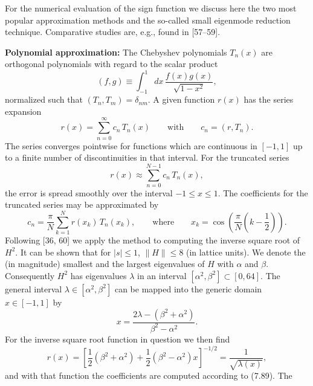 For the numerical evaluation of the sign function we discuss here the two most
popular approximation methods and the so-called small eigenmode reduction
technique. Comparative studies are, e.g., found in [57--59].

\textbf{Polynomial approximation:} The Chebyshev polynomials $T_n(x)$ are
orthogonal polynomials with regard to the scalar product
\begin{equation}
  (f, g) \equiv \int_{-1}^{1} dx\,\frac{f(x)g(x)}{\sqrt{1-x^2}},
\end{equation}
normalized such that $(T_n, T_m) = \delta_{nm}$. A given function $r(x)$ has
the series expansion
\begin{equation}
  r(x) = \sum_{n=0}^{\infty} c_n\,T_n(x) \qquad \text{with} \qquad
  c_n = (r, T_n) .
\end{equation}
The series converges pointwise for functions which are continuous in $[-1, 1]$
up to a finite number of discontinuities in that interval. For the truncated
series
\begin{equation}
  r(x) \approx \sum_{n=0}^{N-1} c_n\,T_n(x),
\end{equation}
the error is spread smoothly over the interval $-1 \leq x \leq 1$. The
coefficients for the truncated series may be approximated by
\begin{equation}
  c_n = \frac{\pi}{N}\sum_{k=1}^{N} r(x_k)\,T_n(x_k),
  \qquad \text{where} \qquad
  x_k = \cos\!\left(\frac{\pi}{N}\left(k-\frac{1}{2}\right)\right) .
\end{equation}
Following [36, 60] we apply the method to computing the inverse square root of
$H^2$. It can be shown that for $|s| \leq 1$, $\|H\| \leq 8$ (in lattice
units). We denote the (in magnitude) smallest and the largest eigenvalues of
$H$ with $\alpha$ and $\beta$. Consequently $H^2$ has eigenvalues $\lambda$ in
an interval $[\alpha^2, \beta^2] \subset [0, 64]$. The general interval
$\lambda \in [\alpha^2, \beta^2]$ can be mapped into the generic domain
$x \in [-1, 1]$ by
\begin{equation}
  x = \frac{2\lambda - (\beta^2 + \alpha^2)}{\beta^2 - \alpha^2} .
\end{equation}
For the inverse square root function in question we then find
\begin{equation}
  r(x) = \left[\frac{1}{2}(\beta^2+\alpha^2) + \frac{1}{2}(\beta^2-\alpha^2)x\right]^{-1/2}
  = \frac{1}{\sqrt{\lambda(x)}},
\end{equation}
and with that function the coefficients are computed according to (7.89). The
